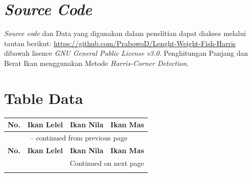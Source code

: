 \appendix 

\chapter{\textit{Source Code}}
\textit{Source code} dan Data yang digunakan dalam penelitian dapat diakses melalui tautan berikut: \url{https://github.com/PrabowoD/Lenght-Weight-Fish-Harris}
dibawah lisence \textit{GNU General Public License v3.0}. Penghitungan Panjang dan Berat Ikan menggunakan Metode \textit{Harris-Corner Detection}.

\chapter{Table Data}

\begin{longtable}{|c|c|c|c|}
    \hline
    \textbf{No.} & \textbf{Ikan Lelel} & \textbf{Ikan Nila} & \textbf{Ikan Mas} \\
    \hline
    \endfirsthead
    \multicolumn{4}{c}{{\tablename\ \thetable{} -- continued from previous page}} \\
    \hline
    \textbf{No.} & \textbf{Ikan Lelel} & \textbf{Ikan Nila} & \textbf{Ikan Mas} \\
    \hline
    \endhead
    \hline \multicolumn{4}{|r|}{{Continued on next page}} \\ \hline
    \endfoot
    \hline
    \endlastfoot


\end{longtable}
